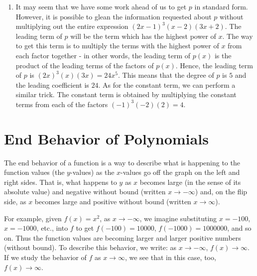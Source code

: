 \documentclass{ximera}
\begin{document}
\begin{example}
\begin{explanation}
\begin{enumerate}
\item  It may seem that we have some work ahead of us to get $p$ in standard form.  However, it is possible to glean the information requested about $p$ without multiplying out the entire expression $(2x-1)^{3}(x-2)(3x+2)$.  The leading term of $p$ will be the term which has the highest power of $x$.  The way to get this term  is to multiply the terms with the highest power of $x$ from each factor together - in other words, the leading term of $p(x)$ is the product of the leading terms of the factors of $p(x)$.  Hence, the leading term of $p$ is $(2x)^3(x)(3x) =  24x^5$.  This means that the degree of $p$ is $5$ and the leading coefficient is $24$.  As for the constant term, we can perform a similar trick.  The constant term is obtained by multiplying the constant terms from each of the factors $(-1)^3(-2)(2) = 4$.  
\end{enumerate}
\end{explanation}
\end{example}

\section{End Behavior of Polynomials}

The end behavior of a function is a way to describe what is happening to the function values (the $y$-values) as the $x$-values go off the graph on the left and right sides.  That is, what happens to $y$ as $x$ becomes large (in the sense of its absolute value) and negative without bound (written $x \rightarrow -\infty$) and, on the flip side, as $x$ becomes large and positive without bound (written $x \rightarrow \infty$).  

For example, given $f(x) = x^2$, as $x \rightarrow -\infty$, we imagine substituting $x=-100$, $x=-1000$, etc., into $f$ to get $f(-100)=10000$, $f(-1000)=1000000$, and so on. Thus  the function values are becoming larger and larger positive numbers (without bound).  To describe this behavior, we write: as $x \rightarrow -\infty$, $f(x) \rightarrow \infty$.  If we study the behavior of $f$ as $x \rightarrow \infty$, we see that in this case, too, $f(x) \rightarrow \infty$.  
\end{document}
